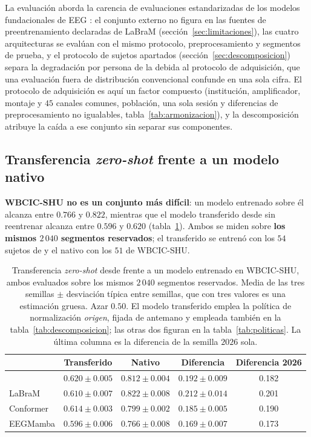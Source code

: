 La evaluación aborda la carencia de evaluaciones estandarizadas de los modelos fundacionales de EEG
\cite{kuruppu2026fmreview}: el conjunto externo no figura en las fuentes de preentrenamiento declaradas de
LaBraM (sección~\ref{sec:limitaciones}), las cuatro arquitecturas se evalúan con el mismo protocolo,
preprocesamiento y segmentos de prueba, y el protocolo de sujetos apartados
(sección~\ref{sec:descomposicion}) separa la degradación por persona de la debida al protocolo de
adquisición, que una evaluación fuera de distribución convencional confunde en una sola cifra. El
protocolo de adquisición es aquí un factor compuesto (institución, amplificador, montaje y $45$ canales
comunes, población, una sola sesión y diferencias de preprocesamiento no igualables,
tabla~\ref{tab:armonizacion}), y la descomposición atribuye la caída a ese conjunto sin separar sus
componentes.

\subsection{Transferencia \textit{zero-shot} frente a un modelo nativo}

\textbf{WBCIC-SHU no es un conjunto más difícil}: un modelo entrenado sobre él alcanza entre $0.766$ y
$0.822$, mientras que el modelo transferido desde \openbmi{} sin reentrenar alcanza entre $0.596$ y $0.620$
(tabla~\ref{tab:transferencia}). Ambos se miden sobre \textbf{los mismos $2\,040$ segmentos reservados}; el
transferido se entrenó con los $54$ sujetos de \openbmi{} y el nativo con los $51$ de WBCIC-SHU.

\begin{table}[H]
\centering
\caption{Transferencia \textit{zero-shot} desde \openbmi{} frente a un modelo entrenado en
WBCIC-SHU, ambos evaluados sobre los mismos $2\,040$ segmentos reservados. Media de las tres
semillas $\pm$ desviación típica entre semillas, que con tres valores es una estimación gruesa.
Azar $0.50$. El modelo transferido emplea la política de normalización \emph{origen}, fijada de
antemano y empleada también en la tabla~\ref{tab:descomposicion}; las otras dos figuran en la
tabla~\ref{tab:politicas}. La última columna es la diferencia de la semilla $2026$ sola.}
\label{tab:transferencia}
\small
\begin{tabular}{lcccc}
\toprule
 & \textbf{Transferido} & \textbf{Nativo} & \textbf{Diferencia} & Diferencia 2026 \\
\midrule
\eegnet{} & $0.620 \pm 0.005$ & $0.812 \pm 0.004$ & $0.192 \pm 0.009$ & 0.182 \\
LaBraM & $0.610 \pm 0.007$ & $0.822 \pm 0.008$ & $0.212 \pm 0.014$ & 0.201 \\
Conformer & $0.614 \pm 0.003$ & $0.799 \pm 0.002$ & $0.185 \pm 0.005$ & 0.190 \\
EEGMamba & $0.596 \pm 0.006$ & $0.766 \pm 0.008$ & $0.169 \pm 0.007$ & 0.173 \\
\bottomrule
\end{tabular}
\end{table}

